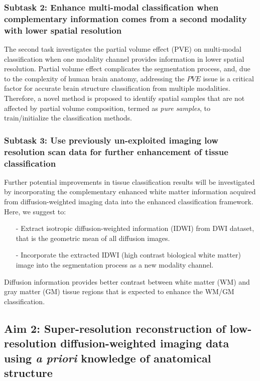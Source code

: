 \subsubsection{Subtask 2: Enhance multi-modal classification when complementary information comes from a second modality with lower spatial resolution}

The second task investigates the partial volume effect (PVE) on multi-modal classification when one modality channel provides information in lower spatial resolution. Partial volume effect complicates the segmentation process, and, due to the complexity of human brain anatomy, addressing the $PVE$ issue is a critical factor for accurate brain structure classification from multiple modalities. Therefore, a novel method is proposed to identify spatial samples that are not affected by partial volume composition, termed as \textit{pure samples}, to train/initialize the classification methods.

\subsubsection{Subtask 3: Use previously un-exploited imaging low resolution scan data for further enhancement of tissue classification}


Further potential improvements in tissue classification results will be investigated by incorporating the complementary enhanced white matter information acquired from diffusion-weighted imaging data into the enhanced classification framework. Here, we suggest to:
\begin{itemize}
    \item[-] Extract isotropic diffusion-weighted information (IDWI) from DWI dataset, that is the geometric mean of all diffusion images.
    \item[-] Incorporate the extracted IDWI (high contrast biological white matter) image into the segmentation process as a new modality channel.
\end{itemize}

Diffusion information provides better contrast between white matter (WM) and gray matter (GM) tissue regions that is expected to enhance the WM/GM classification.

\subsection{Aim 2: Super-resolution reconstruction of low-resolution diffusion-weighted imaging data using \emph{a priori} knowledge of anatomical structure}

